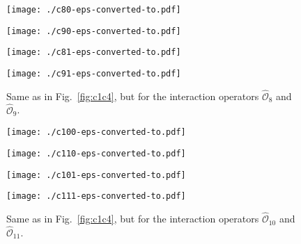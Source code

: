 \documentclass[11pt,a4paper]{article}
\begin{document}
\begin{figure}[t]
\begin{center}
\begin{minipage}[t]{0.49\linewidth}
\centering
\texttt{[image: ./c80-eps-converted-to.pdf]}
\end{minipage}
\begin{minipage}[t]{0.49\linewidth}
\centering
\texttt{[image: ./c90-eps-converted-to.pdf]}
\end{minipage}
\begin{minipage}[t]{0.49\linewidth}
\centering
\texttt{[image: ./c81-eps-converted-to.pdf]}
\end{minipage}
\begin{minipage}[t]{0.49\linewidth}
\centering
\texttt{[image: ./c91-eps-converted-to.pdf]}
\end{minipage}
\end{center}
\caption{Same as in Fig.~\ref{fig:c1c4}, but for the interaction operators $\hat{\mathcal{O}}_8$ and $\hat{\mathcal{O}}_9$.}
\label{fig:c8c9}
\end{figure}
\begin{figure}[t]
\begin{center}
\begin{minipage}[t]{0.49\linewidth}
\centering
\texttt{[image: ./c100-eps-converted-to.pdf]}
\end{minipage}
\begin{minipage}[t]{0.49\linewidth}
\centering
\texttt{[image: ./c110-eps-converted-to.pdf]}
\end{minipage}
\begin{minipage}[t]{0.49\linewidth}
\centering
\texttt{[image: ./c101-eps-converted-to.pdf]}
\end{minipage}
\begin{minipage}[t]{0.49\linewidth}
\centering
\texttt{[image: ./c111-eps-converted-to.pdf]}
\end{minipage}
\end{center}
\caption{Same as in Fig.~\ref{fig:c1c4}, but for the interaction operators $\hat{\mathcal{O}}_{10}$ and $\hat{\mathcal{O}}_{11}$.}
\label{fig:c10c11}
\end{figure}
\end{document}
